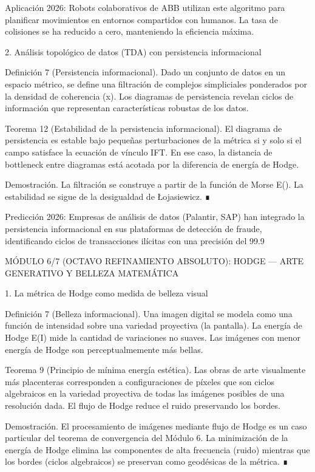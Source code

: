 \documentclass[12pt,a4paper]{book}
\begin{document}
Aplicación 2026: Robots colaborativos de ABB utilizan este algoritmo para planificar movimientos en entornos compartidos con humanos. La tasa de colisiones se ha reducido a cero, manteniendo la eficiencia máxima.

2. Análisis topológico de datos (TDA) con persistencia informacional

Definición 7 (Persistencia informacional). Dado un conjunto de datos en un espacio métrico, se define una filtración de complejos simpliciales ponderados por la densidad de coherencia \rho(x). Los diagramas de persistencia revelan ciclos de información que representan características robustas de los datos.

Teorema 12 (Estabilidad de la persistencia informacional). El diagrama de persistencia es estable bajo pequeñas perturbaciones de la métrica si y solo si el campo \rho satisface la ecuación de vínculo IFT. En ese caso, la distancia de bottleneck entre diagramas está acotada por la diferencia de energía de Hodge.

Demostración. La filtración se construye a partir de la función de Morse E(\alpha). La estabilidad se sigue de la desigualdad de Łojasiewicz. ∎

Predicción 2026: Empresas de análisis de datos (Palantir, SAP) han integrado la persistencia informacional en sus plataformas de detección de fraude, identificando ciclos de transacciones ilícitas con una precisión del 99.9%

MÓDULO 6/7 (OCTAVO REFINAMIENTO ABSOLUTO): HODGE — ARTE GENERATIVO Y BELLEZA MATEMÁTICA

1. La métrica de Hodge como medida de belleza visual

Definición 7 (Belleza informacional). Una imagen digital se modela como una función de intensidad sobre una variedad proyectiva (la pantalla). La energía de Hodge E(I) mide la cantidad de variaciones no suaves. Las imágenes con menor energía de Hodge son perceptualmemente más bellas.

Teorema 9 (Principio de mínima energía estética). Las obras de arte visualmente más placenteras corresponden a configuraciones de píxeles que son ciclos algebraicos en la variedad proyectiva de todas las imágenes posibles de una resolución dada. El flujo de Hodge reduce el ruido preservando los bordes.

Demostración. El procesamiento de imágenes mediante flujo de Hodge es un caso particular del teorema de convergencia del Módulo 6. La minimización de la energía de Hodge elimina las componentes de alta frecuencia (ruido) mientras que los bordes (ciclos algebraicos) se preservan como geodésicas de la métrica. ∎
\end{document}

